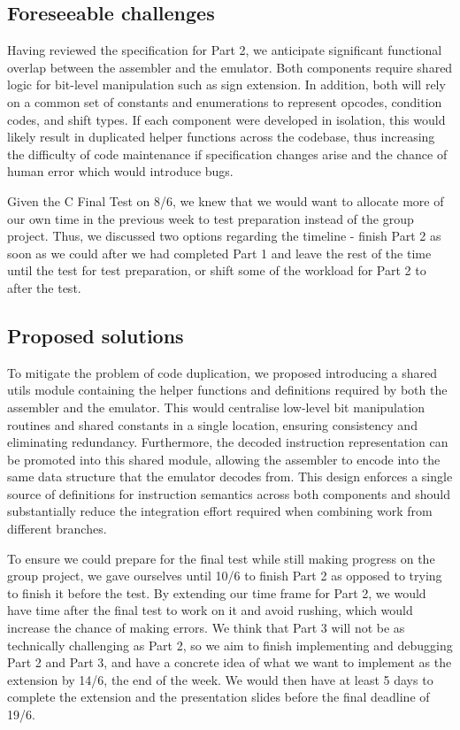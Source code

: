 \documentclass{article}
\begin{document}
\subsection{Foreseeable challenges}
Having reviewed the specification for Part 2, we anticipate significant functional overlap between the assembler and the emulator. Both components require shared logic for bit-level manipulation such as sign extension. In addition, both will rely on a common set of constants and enumerations to represent opcodes, condition codes, and shift types. If each component were developed in isolation, this would likely result in duplicated helper functions across the codebase, thus increasing the difficulty of code maintenance if specification changes arise and the chance of human error which would introduce bugs. \newline

Given the C Final Test on 8/6, we knew that we would want to allocate more of our own time in the previous week to test preparation instead of the group project. Thus, we discussed two options regarding the timeline - finish Part 2 as soon as we could after we had completed Part 1 and leave the rest of the time until the test for test preparation, or shift some of the workload for Part 2 to after the test. 

\subsection{Proposed solutions}
To mitigate the problem of code duplication, we proposed introducing a shared utils module containing the helper functions and definitions required by both the assembler and the emulator. This would centralise low-level bit manipulation routines and shared constants in a single location, ensuring consistency and eliminating redundancy. Furthermore, the decoded instruction representation can be promoted into this shared module, allowing the assembler to encode into the same data structure that the emulator decodes from. This design enforces a single source of definitions for instruction semantics across both components and should substantially reduce the integration effort required when combining work from different branches. \newline

To ensure we could prepare for the final test while still making progress on the group project, we gave ourselves until 10/6 to finish Part 2 as opposed to trying to finish it before the test. By extending our time frame for Part 2, we would have time after the final test to work on it and avoid rushing, which would increase the chance of making errors. We think that Part 3 will not be as technically challenging as Part 2, so we aim to finish implementing and debugging Part 2 and Part 3, and have a concrete idea of what we want to implement as the extension by 14/6, the end of the week. We would then have at least 5 days to complete the extension and the presentation slides before the final deadline of 19/6. 
\end{document}
